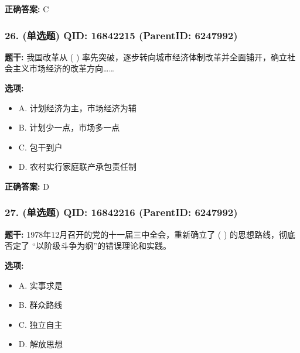 \documentclass[12pt,UTF8]{ctexart}
\begin{document}
\textbf{正确答案:}
C

\vspace{0.3em}\hrulefill\vspace{0.7em}

\subsubsection*{26. (单选题) \small QID: 16842215 (ParentID: 6247992)}

\textbf{题干:}
我国改革从 ( ) 率先突破，逐步转向城市经济体制改革并全面铺开，确立社会主义市场经济的改革方向……



\textbf{选项:}
\begin{itemize}[leftmargin=*]

  \item A. 计划经济为主，市场经济为辅

  \item B. 计划少一点，市场多一点

  \item C. 包干到户

  \item D. 农村实行家庭联产承包责任制

\end{itemize}

\textbf{正确答案:}
D

\vspace{0.3em}\hrulefill\vspace{0.7em}

\subsubsection*{27. (单选题) \small QID: 16842216 (ParentID: 6247992)}

\textbf{题干:}
1978年12月召开的党的十一届三中全会，重新确立了 ( ) 的思想路线，彻底否定了 “以阶级斗争为纲”的错误理论和实践。



\textbf{选项:}
\begin{itemize}[leftmargin=*]

  \item A. 实事求是

  \item B. 群众路线

  \item C. 独立自主

  \item D. 解放思想

\end{itemize}
\end{document}
